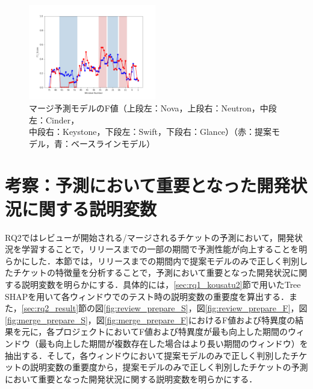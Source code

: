 \documentclass[submit]{ipsj}
\begin{document}
\begin{figure}[t]
\begin{center}
    \includegraphics[width=0.495\textwidth]{Uenaka_fig/RQ2_result/Glance/Glance_merge_F1.pdf}
    \caption{マージ予測モデルのF値（上段左：Nova，上段右：Neutron，中段左：Cinder，\\ 中段右：Keystone，下段左：Swift，下段右：Glance）（赤：提案モデル，青：ベースラインモデル）}
    \label{fig:merge_f}
\end{center}
\end{figure}


\section{考察：予測において重要となった開発状況に関する説明変数}\label{sec:rq2_kousatu}
RQ2ではレビューが開始される/マージされるチケットの予測において，開発状況を学習することで，リリースまでの一部の期間で予測性能が向上することを明らかにした．本節では，リリースまでの期間内で提案モデルのみで正しく判別したチケットの特徴量を分析することで，予測において重要となった開発状況に関する説明変数を明らかにする．具体的には，\ref{sec:rq1_kousatu2}節で用いたTree SHAPを用いて各ウィンドウでのテスト時の説明変数の重要度を算出する．また，\ref{sec:rq2_result}節の図\ref{fig:review_prepare_S}，図\ref{fig:review_prepare_F}，図\ref{fig:merge_prepare_S}，図\ref{fig:merge_prepare_F}におけるF値および特異度の結果を元に，各プロジェクトにおいてF値および特異度が最も向上した期間のウィンドウ（最も向上した期間が複数存在した場合はより長い期間のウィンドウ）を抽出する．そして，各ウィンドウにおいて提案モデルのみで正しく判別したチケットの説明変数の重要度から，提案モデルのみで正しく判別したチケットの予測において重要となった開発状況に関する説明変数を明らかにする．
\end{document}

